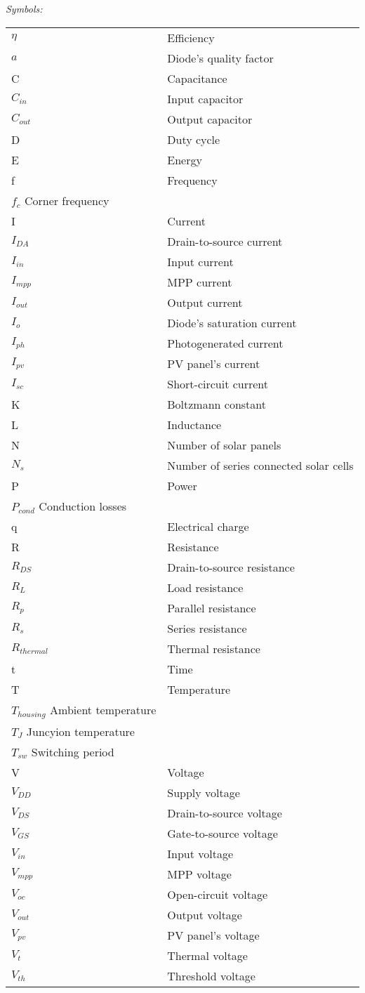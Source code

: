 \noindent\textit{Symbols:}\newline
\begin{tabular}{ll}
$\eta$ & Efficiency\\
$a$ & Diode's quality factor \\
C & Capacitance\\
$C_{in}$ & Input capacitor\\
$C_{out}$ & Output capacitor\\
D & Duty cycle\\
E & Energy\\
f & Frequency\\
$f_{c}$ Corner frequency \\
I & Current\\
$I_{DA}$ & Drain-to-source current \\
$I_{in}$ & Input current \\
$I_{mpp}$ & MPP current\\
$I_{out}$ & Output current \\
$I_{o}$ & Diode's saturation current \\
$I_{ph}$ & Photogenerated current \\
$I_{pv}$ & PV panel's current \\
$I_{sc}$ & Short-circuit current\\
K & Boltzmann constant \\
L & Inductance\\
N & Number of solar panels \\
$N_{s}$ & Number of series connected solar cells \\
P & Power\\
$P_{cond}$ Conduction losses \\
q & Electrical charge \\
R & Resistance\\
$R_{DS}$ & Drain-to-source resistance\\
$R_{L}$ & Load resistance\\
$R_{p}$ & Parallel resistance \\
$R_{s}$ & Series resistance \\
$R_{thermal}$ & Thermal resistance\\
t & Time\\
T & Temperature \\
$T_{housing}$ Ambient temperature \\
$T_{J}$ Juncyion temperature \\
$T_{sw}$ Switching period \\
V & Voltage\\
$V_{DD}$ & Supply voltage\\
$V_{DS}$ & Drain-to-source voltage\\
$V_{GS}$ & Gate-to-source voltage\\
$V_{in}$ & Input voltage \\
$V_{mpp}$ & MPP voltage\\
$V_{oc}$ & Open-circuit voltage\\
$V_{out}$ & Output voltage \\
$V_{pv}$ & PV panel's voltage \\
$V_{t}$ & Thermal voltage \\
$V_{th}$ & Threshold voltage \\

\end{tabular}